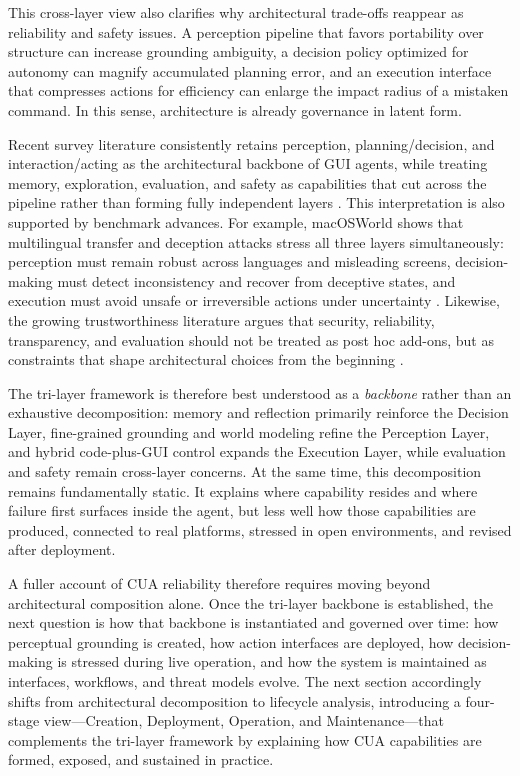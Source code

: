 This cross-layer view also clarifies why architectural trade-offs reappear as reliability and safety issues. A perception pipeline that favors portability over structure can increase grounding ambiguity, a decision policy optimized for autonomy can magnify accumulated planning error, and an execution interface that compresses actions for efficiency can enlarge the impact radius of a mistaken command. In this sense, architecture is already governance in latent form.

Recent survey literature consistently retains perception, planning/decision, and interaction/acting as the architectural backbone of GUI agents, while treating memory, exploration, evaluation, and safety as capabilities that cut across the pipeline rather than forming fully independent layers \cite{tang2025survey,li2025summaryrlgui}. This interpretation is also supported by benchmark advances. For example, macOSWorld shows that multilingual transfer and deception attacks stress all three layers simultaneously: perception must remain robust across languages and misleading screens, decision-making must detect inconsistency and recover from deceptive states, and execution must avoid unsafe or irreversible actions under uncertainty \cite{yang2025macosworld}. Likewise, the growing trustworthiness literature argues that security, reliability, transparency, and evaluation should not be treated as post hoc add-ons, but as constraints that shape architectural choices from the beginning \cite{shi2025trustworthygui}.

The tri-layer framework is therefore best understood as a \emph{backbone} rather than an exhaustive decomposition: memory and reflection primarily reinforce the Decision Layer, fine-grained grounding and world modeling refine the Perception Layer, and hybrid code-plus-GUI control expands the Execution Layer, while evaluation and safety remain cross-layer concerns. At the same time, this decomposition remains fundamentally static. It explains where capability resides and where failure first surfaces inside the agent, but less well how those capabilities are produced, connected to real platforms, stressed in open environments, and revised after deployment.

A fuller account of CUA reliability therefore requires moving beyond architectural composition alone. Once the tri-layer backbone is established, the next question is how that backbone is instantiated and governed over time: how perceptual grounding is created, how action interfaces are deployed, how decision-making is stressed during live operation, and how the system is maintained as interfaces, workflows, and threat models evolve. The next section accordingly shifts from architectural decomposition to lifecycle analysis, introducing a four-stage view---Creation, Deployment, Operation, and Maintenance---that complements the tri-layer framework by explaining how CUA capabilities are formed, exposed, and sustained in practice.

